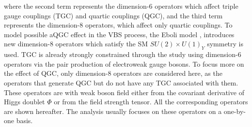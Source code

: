 where the second term represents the dimension-6 operators which affect triple gauge couplings (TGC) and quartic couplings (QGC), and the third term represents the dimension-8 operators, which affect only quartic couplings.
To model possible aQGC effect in the VBS process, the Eboli model \cite{eboli2006p}, introduces new dimension-8 operators which satisfy the SM $SU(2)\times U(1)_Y$ symmetry is used. TGC is already strongly constrained through the study using dimension-6 operators via the pair production of electroweak gauge bosons. To focus more on the effect of QGC, only dimension-8 operators are considered here, as the operators that generate QGC but do not have any TGC associated with them.
These operators are with weak boson field either from the covariant derivative of Higgs doublet $\Phi$ or from the field strength tensor. 
All the corresponding operators are shown hereafter. The analysis usually focuses on these operators on a one-by-one basis.
